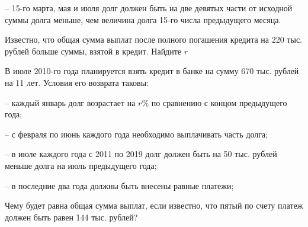 – 15-го марта, мая и июля долг должен быть на две девятых части от исходной суммы долга
меньше, чем величина долга 15-го числа предыдущего месяца.

Известно, что общая сумма выплат после полного погашения кредита на 220 тыс. рублей
больше суммы, взятой в кредит. Найдите $r$

 В июле 2010-го года планируется взять кредит в банке на сумму 670 тыс. рублей на 11 лет.
Условия его возврата таковы:

– каждый январь долг возрастает на $r$\% по сравнению с концом предыдущего года;

– с февраля по июнь каждого года необходимо выплачивать часть долга;

– в июле каждого года с 2011 по 2019 долг должен быть на 50 тыс. рублей меньше долга на
июль предыдущего года;

– в последние два года должны быть внесены равные платежи;

Чему будет равна общая сумма выплат, если известно, что пятый по счету платеж должен
быть равен 144 тыс. рублей?
